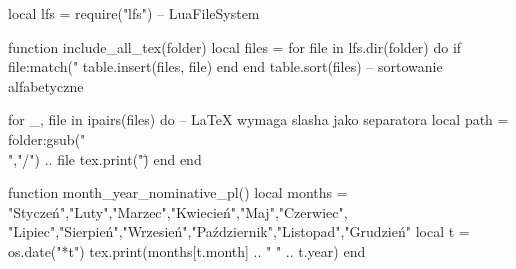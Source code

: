 \newcommand{\MyCopyrightYear}{2024-\the\year}

\usepackage{luacode}


\begin{luacode*}
	local lfs = require("lfs")  -- LuaFileSystem
	
	function include_all_tex(folder)
	local files = {}
	for file in lfs.dir(folder) do
	if file:match("%
	table.insert(files, file)
	end
	end
	table.sort(files)  -- sortowanie alfabetyczne
	
	for _, file in ipairs(files) do
	-- LaTeX wymaga slasha jako separatora
	local path = folder:gsub("\\","/") .. file
	tex.print("\")
	end
	end

\end{luacode*}

\begin{luacode}
	function month_year_nominative_pl()
	local months = {
		"Styczeń","Luty","Marzec","Kwiecień","Maj","Czerwiec",
		"Lipiec","Sierpień","Wrzesień","Październik","Listopad","Grudzień"
	}
	local t = os.date("*t")
	tex.print(months[t.month] .. " " .. t.year)
	end
\end{luacode}

\newcommand{\IncludeAllTex}[1]{%
	\directlua{include_all_tex("#1")}%
}
\newcommand{\monthyearpl}{\protect\directlua{month_year_nominative_pl()}}